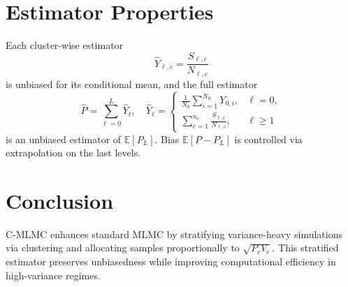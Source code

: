\documentclass{article}
\begin{document}
\section{Estimator Properties}
Each cluster-wise estimator
\[
\hat{Y}_{\ell,c} = \frac{S_{\ell,c}}{N_{\ell,c}}
\]
is unbiased for its conditional mean, and the full estimator
\[
\hat{P} = \sum_{\ell=0}^L \hat{Y}_\ell, \quad \hat{Y}_\ell = 
\begin{cases}
\frac{1}{N_0} \sum_{i=1}^{N_0} Y_{0,i}, & \ell = 0, \\
\sum_{c=1}^{n_c} \frac{S_{\ell,c}}{N_{\ell,c}}, & \ell \ge 1
\end{cases}
\]
is an unbiased estimator of \( \mathbb{E}[P_L] \). Bias \( \mathbb{E}[P - P_L] \) is controlled via extrapolation on the last levels.

\section{Conclusion}
C-MLMC enhances standard MLMC by stratifying variance-heavy simulations via clustering and allocating samples proportionally to \( \sqrt{P_c V_c} \). This stratified estimator preserves unbiasedness while improving computational efficiency in high-variance regimes.
\end{document}
